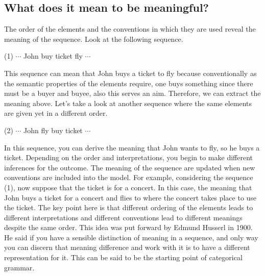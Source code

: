 \documentclass[12pt,a4paper]{article}
\begin{document}
\subsection{What does it mean to be meaningful?}
The order of the elements and the conventions in which they are used reveal the meaning of the sequence. Look at the following sequence. 
\begin{center}
(1) $\cdots$ John buy ticket fly $\cdots$
\end{center}
This sequence can mean that John buys a ticket to fly because conventionally as the semantic properties of the elements require, one buys something since there must be a buyer and buyee, also this serves an aim. Therefore, we can extract the meaning above. Let's take a look at another sequence where the same elements are given yet in a different order.
\begin{center}
(2) $\cdots$ John fly buy ticket $\cdots$
\end{center}
In this sequence, you can derive the meaning that John wants to fly, so he buys a ticket. Depending on the order and interpretations, you begin to make different inferences for the outcome. The meaning of the sequence are updated when new conventions are included into the model. For example, considering the sequence (1), now suppose that the ticket is for a concert. In this case, the meaning that John buys a ticket for a concert and flies to where the concert takes place to use the ticket. The key point here is that different ordering of the elements leads to different interpretations and different conventions lead to different meanings despite the same order. This idea was put forward by Edmund Husserl in 1900. He said if you have a sensible distinction of meaning in a sequence, and only way you can discern that meaning difference and work with it is to have a different representation for it. This can be said to be the starting point of categorical grammar.
\end{document}
